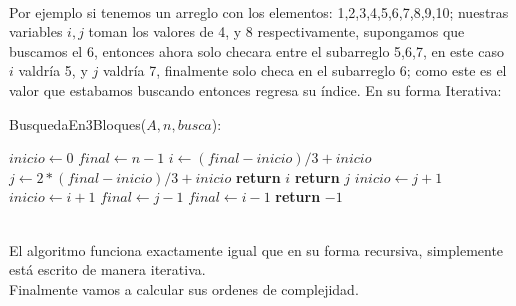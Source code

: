 \documentclass[12pt,twoside]{article}
\begin{document}
\\ Por ejemplo si tenemos un arreglo con los elementos: 1,2,3,4,5,6,7,8,9,10; nuestras variables $i,j$ toman los valores de 4, y 8 respectivamente, supongamos que buscamos el 6, entonces ahora solo checara entre el subarreglo 5,6,7, en este caso $i$ valdría 5, y $j$ valdría 7, finalmente solo checa en el subarreglo 6; como este es el valor que estabamos buscando entonces regresa su índice.
\newpage
En su forma Iterativa:
\begin{algorithm}
    \caption{BusquedaEn3Bloques($A,n,busca$):}
    \begin{algorithmic}
        \State $inicio \gets 0$
        \State $final \gets n-1$
            \State $i \gets (final-inicio)/3+inicio$
            \State $j \gets 2*(final-inicio)/3+inicio$
                \State \textbf{return} $i$
                \State \textbf{return} $j$
                \State $inicio \gets j + 1$
                \State $inicio \gets i + 1$
                \State $final \gets j - 1$
            \Else
                \State $final \gets i - 1$
            \EndIf
        \EndWhile
        \State \textbf{return} $-1$
    \end{algorithmic}
\end{algorithm}
\\ El algoritmo funciona exactamente igual que en su forma recursiva, simplemente está escrito de manera iterativa.
\newline
\\ Finalmente vamos a calcular sus ordenes de complejidad.
\end{document}
